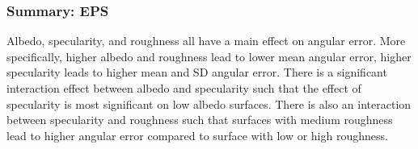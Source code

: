 \subsubsection{Summary: EPS}
Albedo, specularity, and roughness all have a main effect on angular error. More specifically, higher albedo and roughness lead to lower mean angular error, higher specularity leads to higher mean and SD angular error. There is a significant interaction effect between albedo and specularity such that the effect of specularity is most significant on low albedo surfaces. There is also an interaction between specularity and roughness such that surfaces with medium roughness lead to higher angular error compared to surface with low or high roughness.



